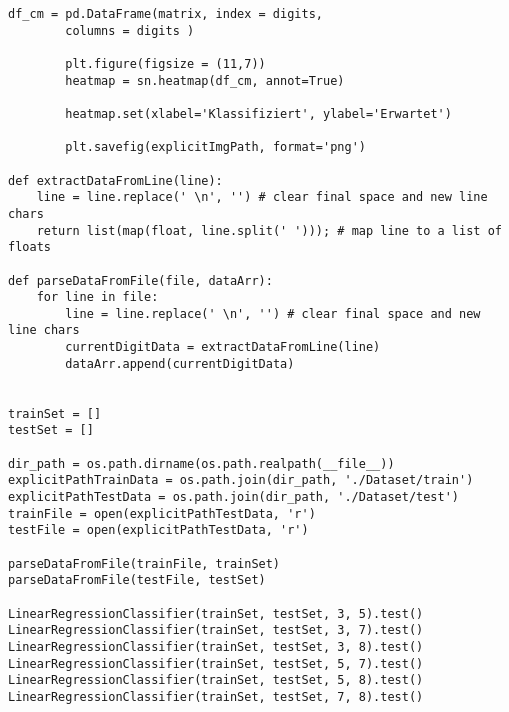 \begin{lstlisting}[style=py]
		df_cm = pd.DataFrame(matrix, index = digits,
		columns = digits )

		plt.figure(figsize = (11,7))
		heatmap = sn.heatmap(df_cm, annot=True)

		heatmap.set(xlabel='Klassifiziert', ylabel='Erwartet')

		plt.savefig(explicitImgPath, format='png')

def extractDataFromLine(line):
	line = line.replace(' \n', '') # clear final space and new line chars
	return list(map(float, line.split(' '))); # map line to a list of floats

def parseDataFromFile(file, dataArr):
	for line in file:
		line = line.replace(' \n', '') # clear final space and new line chars
		currentDigitData = extractDataFromLine(line)
		dataArr.append(currentDigitData)


trainSet = []
testSet = []

dir_path = os.path.dirname(os.path.realpath(__file__))
explicitPathTrainData = os.path.join(dir_path, './Dataset/train')
explicitPathTestData = os.path.join(dir_path, './Dataset/test')
trainFile = open(explicitPathTestData, 'r')
testFile = open(explicitPathTestData, 'r')

parseDataFromFile(trainFile, trainSet)
parseDataFromFile(testFile, testSet)

LinearRegressionClassifier(trainSet, testSet, 3, 5).test()
LinearRegressionClassifier(trainSet, testSet, 3, 7).test()
LinearRegressionClassifier(trainSet, testSet, 3, 8).test()
LinearRegressionClassifier(trainSet, testSet, 5, 7).test()
LinearRegressionClassifier(trainSet, testSet, 5, 8).test()
LinearRegressionClassifier(trainSet, testSet, 7, 8).test()
\end{lstlisting}



